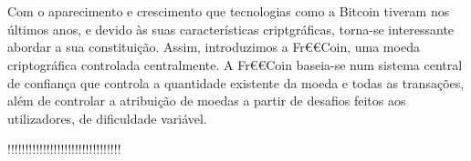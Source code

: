 \documentclass[10pt,twoside]{estiloUBI}
\begin{document}
\onehalfspacing





\pagestyle{fancy}





















{ \let\cleardoublepage\clearpage}


\newpage \let\cleardoublepage\clearpage
\section*{}
Com o aparecimento e crescimento que tecnologias como a Bitcoin tiveram nos últimos anos, e devido às suas características criptgráficas, torna-se interessante abordar a sua constituição. Assim, introduzimos a Fr€€Coin, uma moeda criptográfica controlada centralmente.
A Fr€€Coin baseia-se num sistema central de confiança que controla a quantidade existente da moeda e todas as transações, além de controlar a atribuição de moedas a partir de desafios feitos aos utilizadores, de dificuldade variável.

!!!!!!!!!!!!!!!!!!!!!!!!!!!!!!!!


{\tableofcontents \let\cleardoublepage\clearpage
\listoffigures \let\cleardoublepage\clearpage
\listoftables \let\cleardoublepage\clearpage}

\end{document}
